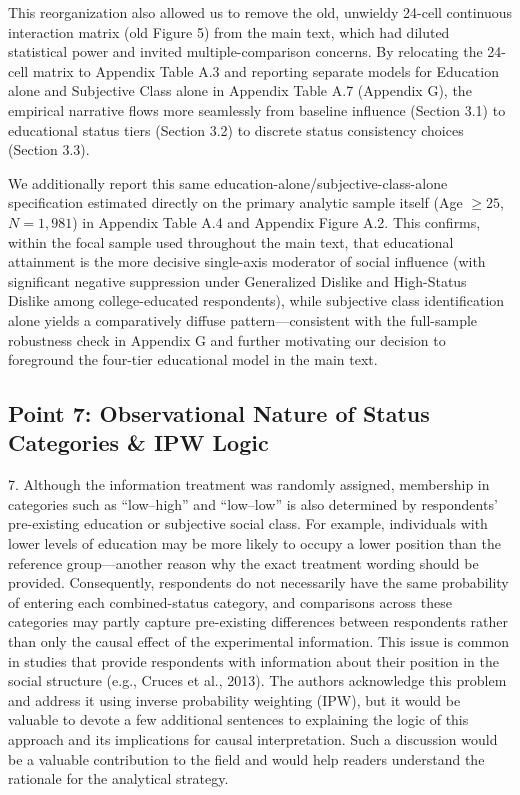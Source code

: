 \documentclass[11pt, letterpaper]{article}
\begin{document}
This reorganization also allowed us to remove the old, unwieldy 24-cell continuous interaction matrix (old Figure 5) from the main text, which had diluted statistical power and invited multiple-comparison concerns. By relocating the 24-cell matrix to Appendix Table A.3 and reporting separate models for Education alone and Subjective Class alone in Appendix Table A.7 (Appendix G), the empirical narrative flows more seamlessly from baseline influence (Section 3.1) to educational status tiers (Section 3.2) to discrete status consistency choices (Section 3.3).

We additionally report this same education-alone/subjective-class-alone specification estimated directly on the primary analytic sample itself (Age $\ge 25$, $N = 1{,}981$) in Appendix Table A.4 and Appendix Figure A.2. This confirms, within the focal sample used throughout the main text, that educational attainment is the more decisive single-axis moderator of social influence (with significant negative suppression under Generalized Dislike and High-Status Dislike among college-educated respondents), while subjective class identification alone yields a comparatively diffuse pattern---consistent with the full-sample robustness check in Appendix G and further motivating our decision to foreground the four-tier educational model in the main text.

\vspace{10pt}

\subsection*{Point 7: Observational Nature of Status Categories \& IPW Logic}

\begin{reviewercomment}
7. Although the information treatment was randomly assigned, membership in categories such as ``low--high'' and ``low--low'' is also determined by respondents' pre-existing education or subjective social class. For example, individuals with lower levels of education may be more likely to occupy a lower position than the reference group---another reason why the exact treatment wording should be provided. Consequently, respondents do not necessarily have the same probability of entering each combined-status category, and comparisons across these categories may partly capture pre-existing differences between respondents rather than only the causal effect of the experimental information. This issue is common in studies that provide respondents with information about their position in the social structure (e.g., Cruces et al., 2013). The authors acknowledge this problem and address it using inverse probability weighting (IPW), but it would be valuable to devote a few additional sentences to explaining the logic of this approach and its implications for causal interpretation. Such a discussion would be a valuable contribution to the field and would help readers understand the rationale for the analytical strategy.
\end{reviewercomment}
\end{document}
